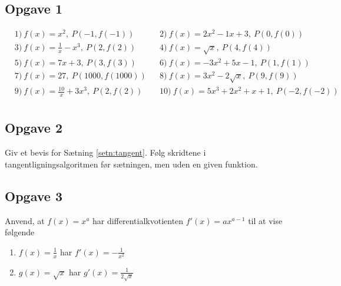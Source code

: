 \subsection*{Opgave 1}
\begin{align*}
&1) \ f(x) = x^2,\  P(-1,f(-1))  &&2) \   f(x)=2x^2-1x+3, \ P(0,f(0))    \\
&3) \ f(x) = \frac{1}{x} -x^3, \ P(2,f(2))   &&4) \ f(x) = \sqrt{x}, \ P(4,f(4))    \\
&5) \ f(x) = 7x+3,\ P(3,f(3))   &&6) \ f(x) = -3x^2+5x-1, \ P(1,f(1))     \\
&7) \ f(x) = 27, \ P(1000,f(1000))   &&8) \ f(x) = 3x^2-2\sqrt{x}, \ P(9,f(9))     \\
&9) \ f(x) = \frac{10}{x}+3x^3, \ P(2,f(2))   &&10) \ f(x) = 5x^3+2x^2+x+1, \ P(-2,f(-2))     \\
\end{align*}
	
\subsection*{Opgave 2}
Giv et bevis for Sætning \ref{setn:tangent}. Følg skridtene i tangentligningsalgoritmen før sætningen, men uden en given funktion.
	
	
\subsection*{Opgave 3}
Anvend, at $f(x) = x^a$ har differentialkvotienten $f'(x) = ax^{a-1}$ til at vise følgende
\begin{enumerate}[label=\roman*)]
	\item $f(x) = \frac{1}{x}$ har $f'(x) = -\frac{1}{x^2}$
	\item $g(x) = \sqrt{x}$ har $g'(x) = \frac{1}{2\sqrt{x}}$
\end{enumerate}
